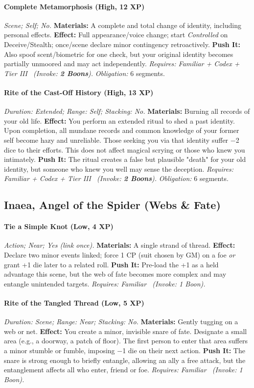 \paragraph{Complete Metamorphosis (High, 12 XP)} \emph{Scene; Self; No.}
\textbf{Materials:} A complete and total change of identity, including personal effects.
\textbf{Effect:} Full appearance/voice change; start \emph{Controlled} on Deceive/Stealth; once/scene declare minor contingency retroactively.
\textbf{Push It:} Also spoof scent/biometric for one check, but your original identity becomes partially unmoored and may act independently.
\emph{Requires: Familiar + Codex + Tier III \ (\textit{Invoke:} \textbf{2 Boons}).}
\emph{Obligation:} 6 segments.

\paragraph{Rite of the Cast-Off History (High, 13 XP)} \emph{Duration: Extended; Range: Self; Stacking: No.}
\textbf{Materials:} Burning all records of your old life.
\textbf{Effect:} You perform an extended ritual to shed a past identity. Upon completion, all mundane records and common knowledge of your former self become hazy and unreliable. Those seeking you via that identity suffer −2 dice to their efforts. This does not affect magical scrying or those who knew you intimately.
\textbf{Push It:} The ritual creates a false but plausible "death" for your old identity, but someone who knew you well may sense the deception.
\emph{Requires: Familiar + Codex + Tier III \ (\textit{Invoke:} \textbf{2 Boons}).}
\emph{Obligation:} 6 segments.

\subsection{Inaea, Angel of the Spider (Webs \& Fate)}
\paragraph{Tie a Simple Knot (Low, 4 XP)} \emph{Action; Near; Yes (link once).}
\textbf{Materials:} A single strand of thread.
\textbf{Effect:} Declare two minor events linked; force 1 CP (suit chosen by GM) on a foe \emph{or} grant +1 die later to a related roll.
\textbf{Push It:} Pre-load the +1 as a held advantage this scene, but the web of fate becomes more complex and may entangle unintended targets.
\emph{Requires: Familiar \ (\textit{Invoke:} 1 Boon).}
\paragraph{Rite of the Tangled Thread (Low, 5 XP)} \emph{Duration: Scene; Range: Near; Stacking: No.}
\textbf{Materials:} Gently tugging on a web or net.
\textbf{Effect:} You create a minor, invisible snare of fate. Designate a small area (e.g., a doorway, a patch of floor). The first person to enter that area suffers a minor stumble or fumble, imposing −1 die on their next action.
\textbf{Push It:} The snare is strong enough to briefly entangle, allowing an ally a free attack, but the entanglement affects all who enter, friend or foe.
\emph{Requires: Familiar \ (\textit{Invoke:} 1 Boon).}
